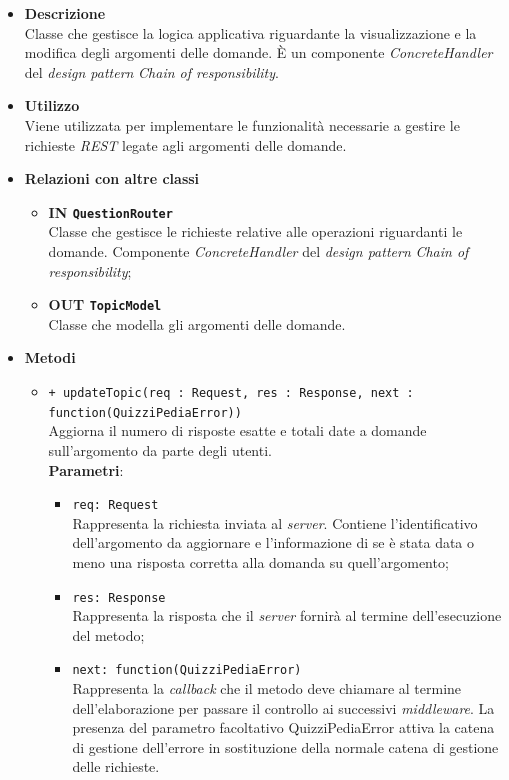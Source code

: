 \begin{itemize}
	\item \textbf{Descrizione} \\
	Classe che gestisce la logica applicativa riguardante la visualizzazione e la modifica degli argomenti delle domande. È un componente \textit{ConcreteHandler} del \textit{design pattern} \textit{Chain of responsibility}.
	\item \textbf{Utilizzo} \\
	Viene utilizzata per implementare le funzionalità necessarie a gestire le richieste \textit{REST} legate agli argomenti delle domande.
	\item \textbf{Relazioni con altre classi}
		\begin{itemize}
			\item \textbf{IN \texttt{QuestionRouter}} \\
			Classe che gestisce le richieste relative alle operazioni riguardanti le domande. Componente \textit{ConcreteHandler} del \textit{design pattern} \textit{Chain of responsibility};
			\item \textbf{OUT \texttt{TopicModel}} \\
			Classe che modella gli argomenti delle domande.
		\end{itemize}
	\item \textbf{Metodi}
		\begin{itemize}
			\item \texttt{+ updateTopic(req : Request, res : Response, next : function(QuizziPediaError))} \\
			Aggiorna il numero di risposte esatte e totali date a domande sull'argomento da parte degli utenti. \\
			\textbf{Parametri}:
			\begin{itemize}
			\item \texttt{req: Request} \\
			Rappresenta la richiesta inviata al \textit{server}. Contiene l'identificativo dell'argomento da aggiornare e l'informazione di se è stata data o meno una risposta corretta alla domanda su quell'argomento;
			\item \texttt{res: Response} \\
			Rappresenta la risposta che il \textit{server} fornirà al termine dell'esecuzione del metodo;
			\item \texttt{next: function(QuizziPediaError)} \\
			Rappresenta la \textit{callback} che il metodo deve chiamare al termine dell'elaborazione per passare il controllo ai successivi \textit{middleware}. La presenza del parametro facoltativo QuizziPediaError attiva la catena di gestione dell'errore in sostituzione della normale catena di gestione delle richieste.

\end{itemize}
\end{itemize}
\end{itemize}
